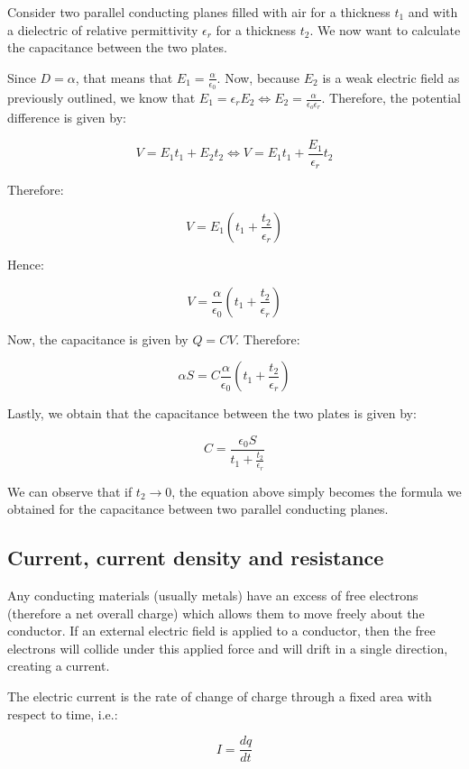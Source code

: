 \documentclass{article}
\begin{document}
\begin{example}
    Consider two parallel conducting planes filled with air for a thickness $t_1$ and with a dielectric of relative permittivity $\epsilon_r$ for a thickness $t_2$. We now want to calculate the capacitance between the two plates.

    Since $D = \alpha$, that means that $E_1 = \frac{\alpha}{\epsilon_0}$. Now, because $E_2$ is a weak electric field as previously outlined, we know that $E_1 = \epsilon_r E_2 \iff E_2 = \frac{\alpha}{\epsilon_o\epsilon_r}$. Therefore, the potential difference is given by:

    \[ V = E_1t_1 + E_2t_2 \iff V = E_1t_1 + \frac{E_1}{\epsilon_r}t_2 \]

    Therefore:

    \[ V = E_1\left(t_1 + \frac{t_2}{\epsilon_r}\right) \]

    Hence:

    \[ V = \frac{\alpha}{\epsilon_0}\left(t_1 + \frac{t_2}{\epsilon_r}\right) \]

    Now, the capacitance is given by $Q = CV$. Therefore:

    \[ \alpha S = C \frac{\alpha}{\epsilon_0}\left(t_1 + \frac{t_2}{\epsilon_r}\right) \]

    Lastly, we obtain that the capacitance between the two plates is given by:

    \[ C = \frac{\epsilon_0S}{t_1 + \frac{t_2}{\epsilon_r}} \]

    We can observe that if $t_2 \to 0$, the equation above simply becomes the formula we obtained for the capacitance between two parallel conducting planes.
\end{example}

\newpage

\subsection{Current, current density and resistance}

Any conducting materials (usually metals) have an excess of free electrons (therefore a net overall charge) which allows them to move freely about the conductor. If an external electric field is applied to a conductor, then the free electrons will collide under this applied force and will drift in a single direction, creating a current. 

\begin{definition}[Current]
    The electric current is the rate of change of charge through a fixed area with respect to time, i.e.:

    \[ I = \frac{dq}{dt} \]
\end{definition}
\end{document}
